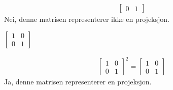 \documentclass[11pt, a4paper, norsk]{NTNUoving}
\begin{document}
\begin{oppgave}
\begin{align*}
\begin{bmatrix}
               0 & 1
           \end{bmatrix}
       \end{align*}
       Nei, denne matrisen representerer ikke en projeksjon.
       \begin{punkt}
           $
            \begin{bmatrix}
               1 & 0 \\
               0 & 1
           \end{bmatrix}
           $
       \end{punkt}
       \begin{align*}
           \begin{bmatrix}
               1 & 0 \\
               0 & 1
           \end{bmatrix}^2 = \begin{bmatrix}
               1 & 0 \\
               0 & 1
           \end{bmatrix}
       \end{align*}
       Ja, denne matrisen representerer en projeksjon.
   \end{oppgave}
\end{document}
